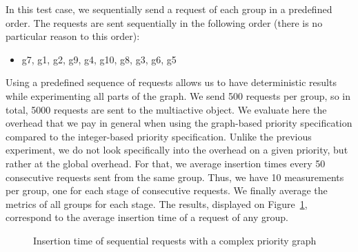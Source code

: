 \documentclass[11pt]{report}
\begin{document}
In this test case, we sequentially send a request of each group in a predefined order. The requests are sent sequentially in the following order (there is no particular reason to this order):
\begin{itemize}
\item g7, g1, g2, g9, g4, g10, g8, g3, g6, g5
\end{itemize}
Using a predefined sequence of requests allows us to have deterministic results while experimenting all parts of the graph. We send 500 requests per group, so in total, 5000 requests are sent to the multiactive object. 
We evaluate here the overhead that we pay in general when using the graph-based priority specification compared to the integer-based priority specification. Unlike the previous experiment, we do not look specifically into the overhead on a given priority, but rather at the global overhead. For that, we average insertion times every 50 consecutive requests sent from the same group. Thus, we have 10 measurements per group, one for each stage of consecutive requests. We finally average the metrics of all groups for each stage. The results, displayed on Figure~\ref{fig:sequential}, correspond to the average insertion time of a request of any group.

\begin{figure}[!ht]
      \caption{Insertion time of sequential requests with a complex priority graph}
      \label{fig:sequential} 
\end{figure}
\end{document}
